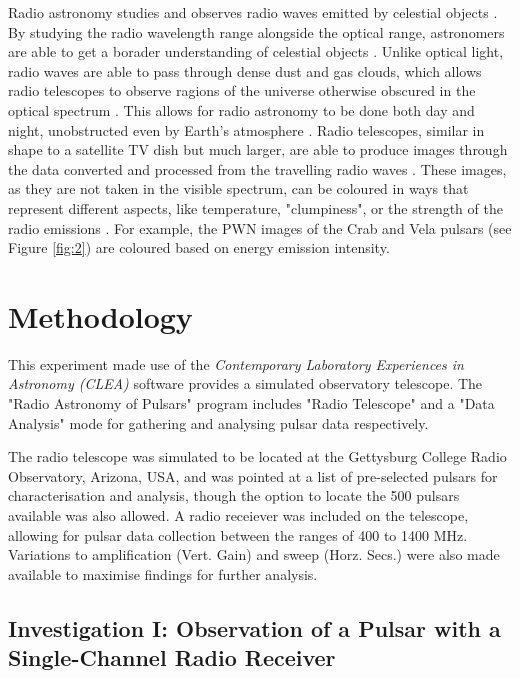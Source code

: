 \documentclass[12pt]{article}
\begin{document}
Radio astronomy studies and observes radio waves emitted by celestial objects \cite{radioastro,TAN20203}. By studying the radio wavelength range alongside the optical range, astronomers are able to get a borader understanding of celestial objects \cite{radioastro,TAN20203}.
Unlike optical light, radio waves are able to pass through dense dust and gas clouds, which allows radio telescopes to observe ragions of the universe otherwise obscured in the optical spectrum \cite{TAN20203}.
This allows for radio astronomy to be done both day and night, unobstructed even by Earth's atmosphere \cite{TAN20203}. Radio telescopes, similar in shape to a satellite TV dish but much larger, are able to produce images through the data converted and processed from the travelling radio waves \cite{radioastro}.
These images, as they are not taken in the visible spectrum, can be coloured in ways that represent different aspects, like temperature, "clumpiness", or the strength of the radio emissions \cite{radioastro}.
For example, the PWN images of the Crab and Vela pulsars (see Figure \ref{fig:2}) are coloured based on energy emission intensity.

\newpage

\section{Methodology} \label{sec:2}

This experiment made use of the \textit{Contemporary Laboratory Experiences in Astronomy (CLEA)} software provides a simulated observatory telescope. The "Radio Astronomy of Pulsars" program includes "Radio Telescope" and a "Data Analysis" mode for gathering and analysing pulsar data respectively.

The radio telescope was simulated to be located at the Gettysburg College Radio Observatory, Arizona, USA, and was pointed at a list of pre-selected pulsars for characterisation and analysis, though the option to locate the 500 pulsars available was also allowed. A radio receiever was included on the telescope,
allowing for pulsar data collection between the ranges of 400 to 1400 MHz. Variations to amplification (Vert. Gain) and sweep (Horz. Secs.) were also made available to maximise findings for further analysis.

\subsection{Investigation I: Observation of a Pulsar with a Single-Channel Radio Receiver}
\end{document}
